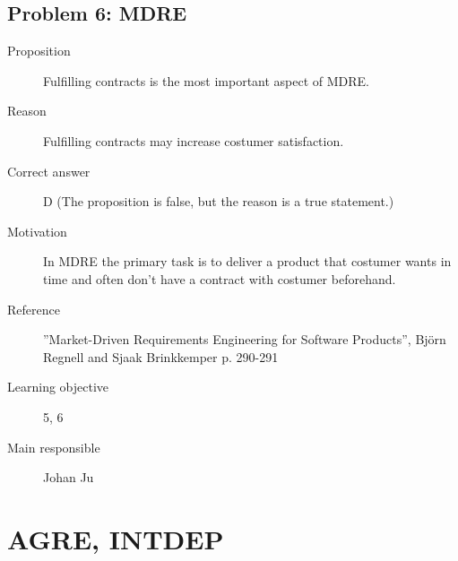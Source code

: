 \documentclass[10pt,a4paper]{article}
\begin{document}
\subsection*{Problem 6: MDRE}
\begin{description}
\item[Proposition] Fulfilling contracts is the most important aspect of MDRE.
\item[Reason] Fulfilling contracts may increase costumer satisfaction. 
\item[Correct answer] D (The proposition is false, but the reason is a true statement.)
\item[Motivation] In MDRE the primary task is to deliver a product that costumer wants in time and often don't have a contract with costumer beforehand.
\item[Reference] ”Market-Driven Requirements Engineering for Software Products”, Björn
Regnell and Sjaak Brinkkemper p. 290-291
\item[Learning objective] 5, 6
\item[Main responsible] Johan Ju
\end{description}



\section*{AGRE, INTDEP}
\end{document}
